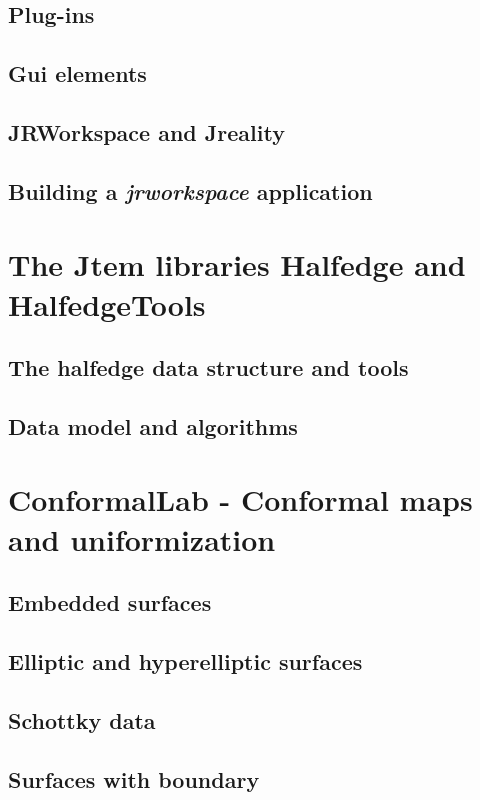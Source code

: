 \label{sec:jrworkspace}
\subsection{Plug-ins}
\subsection{Gui elements}
\subsection{{\sc JRWorkspace} and {\sc Jreality}}
\subsection{Building a \emph{jrworkspace} application}

\section{The {\sc Jtem} libraries {\sc Halfedge} and {\sc HalfedgeTools}}
\subsection{The halfedge data structure and tools}
\subsection{Data model and algorithms}

\section{{\sc ConformalLab} - Conformal maps and uniformization}
\label{sec:conformallab}
\subsection{Embedded surfaces}
\subsection{Elliptic and hyperelliptic surfaces}
\subsection{Schottky data}
\subsection{Surfaces with boundary}


